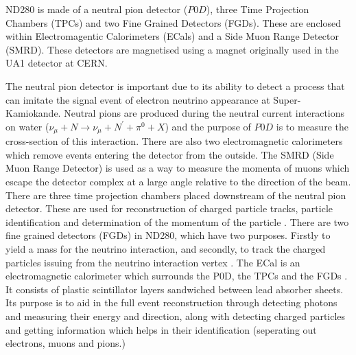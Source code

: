 ND280 is made of a neutral pion detector ($P0D$), three Time Projection Chambers (TPCs) and two Fine Grained Detectors (FGDs). These are enclosed within Electromagentic Calorimeters (ECals) and a Side Muon Range Detector (SMRD). These detectors are magnetised using a magnet originally used in the UA1 detector at CERN. 

The neutral pion detector is important due to its ability to detect a process that can imitate the signal event of electron neutrino appearance at Super-Kamiokande. Neutral pions are produced during the neutral current interactions on water ($\nu_{\mu} + N \rightarrow \nu_{\mu} + N^{'} +\pi^{0} + X$) and the purpose of $P0D$ is to measure the cross-section of this interaction. 
\newline 
 There are also two electromagnetic calorimeters which remove events entering the detector from the outside. The SMRD (Side Muon Range Detector) is used as a way to measure the momenta of muons which escape the detector complex at a large angle relative to the direction of the beam. 
\newline
There are three time projection chambers placed downstream of the neutral pion detector. These are used for reconstruction of charged particle tracks, particle identification and determination of the momentum of the particle \cite{abgrall2011time}. There are two fine grained detectors (FGDs) in ND280, which have two purposes. Firstly to yield a mass for the neutrino interaction, and secondly, to track the charged particles issuing from the neutrino interaction vertex \cite{amaudruz2012t2k}.
\newline
The ECal is an electromagnetic calorimeter which surrounds the P0D, the TPCs and the FGDs \cite{allan2013electromagnetic}. It consists of plastic scintillator layers sandwiched between lead absorber sheets. Its purpose is to aid in the full event reconstruction through detecting photons and measuring their energy and direction, along with detecting charged particles and getting information which helps in their identification (seperating out electrons, muons and pions.)

